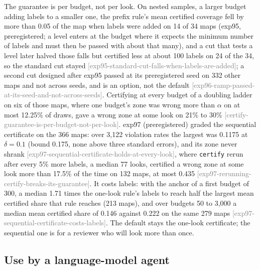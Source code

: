 \documentclass[11pt,a4paper]{article}
\newcommand{\claim}[1]{{\scriptsize\textsf{\textcolor{gray}{[#1]}}}}
\newcommand{\code}[1]{\texttt{#1}}
\begin{document}
The guarantee is per budget, not per look. On nested samples, a larger budget adding labels to a smaller one, the
prefix rule's mean certified coverage fell by more than 0.05 of the map when labels were added on 14 of 34 maps
(exp95, preregistered; a level enters at the budget where it expects the minimum number of labels and must then be
passed with about that many), and a cut that tests a level later halved those falls but certified less at about 100
labels on 24 of the 34, so the standard cut stayed \claim{exp95-standard-cut-falls-when-labels-are-added}; a second
cut designed after exp95 passed at its preregistered seed on 332 other maps and not across seeds, and is an option,
not the default \claim{exp96-ramp-passed-at-its-seed-and-not-across-seeds}. Certifying at every budget of a doubling
ladder on six of those maps, where one budget's zone was wrong more than $\alpha$ on at most 12.25\% of draws, gave a
wrong zone at some look on 21\% to 30\% \claim{certify-guarantee-is-per-budget-not-per-look}. exp97 (preregistered)
graded the sequential certificate on the 366 maps: over 3,122 violation rates the largest was 0.1175 at $\delta = 0.1$
(bound 0.175, none above three standard errors), and its zone never shrank
\claim{exp97-sequential-certificate-holds-at-every-look}, where \code{certify} rerun after every 5\% more labels, a
median 77 looks, certified a wrong zone at some look more than 17.5\% of the time on 132 maps, at most 0.435
\claim{exp97-rerunning-certify-breaks-its-guarantee}. It costs labels: with the anchor of a first budget of 300, a
median 1.71 times the one-look rule's labels to reach half the largest mean certified share that rule reaches (213
maps), and over budgets 50 to 3,000 a median mean certified share of 0.146 against 0.222 on the same 279 maps
\claim{exp97-sequential-certificate-costs-labels}. The default stays the one-look certificate; the sequential one is
for a reviewer who will look more than once.

\subsection{Use by a language-model agent}
\end{document}
